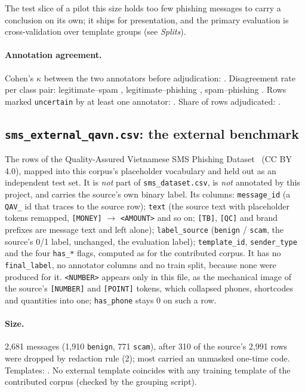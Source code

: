 The test slice of a pilot this size holds too few phishing messages to carry a conclusion on
its own; it ships for presentation, and the primary evaluation is cross-validation over
template groups (see \emph{Splits}).

\paragraph{Annotation agreement.} Cohen's $\kappa$ between the two annotators before
adjudication: \FILL{$\kappa$}. Disagreement rate per class pair: legitimate--spam \FILL{},
legitimate--phishing \FILL{}, spam--phishing \FILL{}. Rows marked \texttt{uncertain} by at
least one annotator: \FILL{}. Share of rows adjudicated: \FILL{}.

\subsection*{\texttt{sms\_external\_qavn.csv}: the external benchmark}
The rows of the Quality-Assured Vietnamese SMS Phishing Dataset~\cite{qavn_sms} (CC BY 4.0),
mapped into this corpus's placeholder vocabulary and held out as an independent test set. It is
\emph{not} part of \texttt{sms\_dataset.csv}, is \emph{not} annotated by this project, and
carries the source's own binary label. Its columns: \texttt{message\_id} (a \texttt{QAV\_} id
that traces to the source row); \texttt{text} (the source text with placeholder tokens remapped,
\texttt{[MONEY]} $\to$ \texttt{<AMOUNT>} and so on; \texttt{[TB]}, \texttt{[QC]} and brand
prefixes are message text and left alone); \texttt{label\_source} (\texttt{benign} /
\texttt{scam}, the source's 0/1 label, unchanged, the evaluation label); \texttt{template\_id},
\texttt{sender\_type} and the four \texttt{has\_*} flags, computed as for the contributed
corpus. It has no \texttt{final\_label}, no annotator columns and no train split, because none
were produced for it. \texttt{<NUMBER>} appears only in this file, as the mechanical image of
the source's \texttt{[NUMBER]} and \texttt{[POINT]} tokens, which collapsed phones, shortcodes
and quantities into one; \texttt{has\_phone} stays 0 on such a row.

\paragraph{Size.} 2{,}681 messages (1{,}910 \texttt{benign}, 771 \texttt{scam}), after 310 of
the source's 2{,}991 rows were dropped by redaction rule (2); most carried an unmasked one-time
code. Templates: . No external template coincides with any training
template of the contributed corpus (checked by the grouping script).

